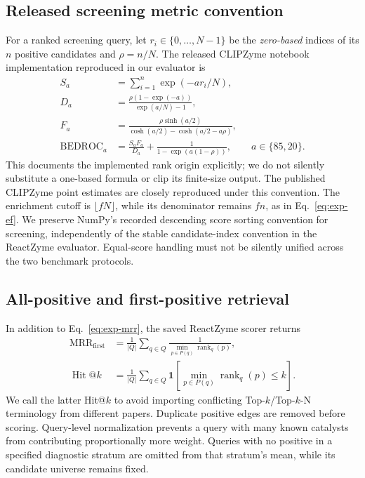 \subsection{Released screening metric convention}
For a ranked screening query, let $r_i\in\{0,\ldots,N-1\}$ be the
\emph{zero-based} indices of its $n$ positive candidates and $\rho=n/N$.
The released CLIPZyme notebook implementation reproduced in our evaluator is
\begin{align}
 S_a &= \sum_{i=1}^{n}\exp(-a r_i/N),\\
 D_a &= \frac{\rho(1-\exp(-a))}{\exp(a/N)-1},\\
 F_a &= \frac{\rho\sinh(a/2)}{\cosh(a/2)-\cosh(a/2-a\rho)},\\
 \operatorname{BEDROC}_{a}
     &= \frac{S_a F_a}{D_a}
       + \frac{1}{1-\exp(a(1-\rho))},\qquad a\in\{85,20\}.
 \label{eq:exp-bedroc}
\end{align}
This documents the implemented rank origin explicitly; we do not silently
substitute a one-based formula or clip its finite-size output. The published
CLIPZyme point estimates are closely reproduced under this convention.
The enrichment cutoff is $\lfloor fN\rfloor$, while its denominator remains
$fn$, as in Eq.~\eqref{eq:exp-ef}. We preserve NumPy's recorded descending
score sorting convention for screening, independently of the stable
candidate-index convention in the ReactZyme evaluator. Equal-score handling
must not be silently unified across the two benchmark protocols.

\subsection{All-positive and first-positive retrieval}
In addition to Eq.~\eqref{eq:exp-mrr}, the saved ReactZyme scorer returns
\begin{align}
 \operatorname{MRR}_{\mathrm{first}}
  &=\frac{1}{|Q|}\sum_{q\in Q}
    \frac{1}{\min_{p\in P(q)}\operatorname{rank}_q(p)},\\
 \operatorname{Hit}@k
  &=\frac{1}{|Q|}\sum_{q\in Q}
    \mathbf{1}\!\left[\min_{p\in P(q)}\operatorname{rank}_q(p)\le k\right].
\end{align}
We call the latter Hit@$k$ to avoid importing conflicting Top-$k$/Top-$k$-N
terminology from different papers. Duplicate positive edges are removed
before scoring. Query-level normalization prevents a query with many known
catalysts from contributing proportionally more weight. Queries with no
positive in a specified diagnostic stratum are omitted from that stratum's
mean, while its candidate universe remains fixed.

